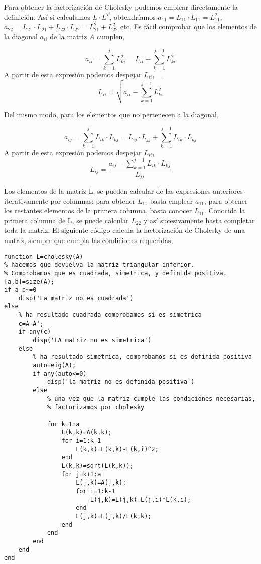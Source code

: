 Para obtener la factorización de Cholesky podemos emplear directamente la definición. Así si calculamos $L\cdot L^T$, obtendríamos $a_{11}=L_{11}\cdot L_{11}=L_{11}^2$,  $a_{22}=L_{21}\cdot L_{21}+L_{22}\cdot L_{22}=L_{21}^2+L_{22}^2$  etc. Es fácil comprobar que los elementos de la diagonal $a_{ii}$ de la matriz $A$ cumplen,

\begin{equation*}
a_{ii}=\sum_{k=1}^{j}L_{ki}^2=L_{ii}+\sum_{k=1}^{j-1}L_{ki}^2
\end{equation*}
A partir de esta expresión podemos despejar $L_{ii}$,
\begin{equation*}
L_{ii}=\sqrt{a_{ii}-\sum_{k=1}^{j-1}L_{ki}^2}
\end{equation*}

Del mismo modo, para los elementos que no pertenecen a la diagonal,

\begin{equation*}
a_{ij}=\sum_{k=1}^{j}L_{ik}\cdot L_{kj}=L_{ij}\cdot L_{jj}+\sum_{k=1}^{j-1}L_{ik}\cdot L_{kj}
\end{equation*}
A partir de esta expresión podemos despejar $L_{ii}$,
\begin{equation*}
L_{ij}=\frac{a_{ij}-\sum_{k=1}^{j-1}L_{ik}\cdot L_{kj}}{L_{jj}}
\end{equation*}

Los elementos de la matriz L, se pueden calcular de las expresiones anteriores iterativamente por columnas: para obtener $L_{11}$ basta emplear $a_{11}$, para obtener los restantes elementos de la primera columna, basta conocer $L_{11}$. Conocida la primera columna de L, se puede calcular $L_{22}$ y así sucesivamente hasta completar toda la matriz. El siguiente código calcula la factorización de Cholesky de una matriz, siempre que cumpla las condiciones requeridas,

\begin{lstlisting}
function L=cholesky(A)
% hacemos que devuelva la matriz triangular inferior.
% Comprobamos que es cuadrada, simetrica, y definida positiva.
[a,b]=size(A);
if a-b~=0
    disp('La matriz no es cuadrada')
else
    % ha resultado cuadrada comprobamos si es simetrica
    c=A-A';
    if any(c)
        disp('LA matriz no es simetrica')
    else
        % ha resultado simetrica, comprobamos si es definida positiva
        auto=eig(A);
        if any(auto<=0)
            disp('la matriz no es definida positiva')
        else
            % una vez que la matriz cumple las condiciones necesarias,
            % factorizamos por cholesky

            for k=1:a
                L(k,k)=A(k,k);
                for i=1:k-1
                    L(k,k)=L(k,k)-L(k,i)^2;
                end
                L(k,k)=sqrt(L(k,k));
                for j=k+1:a
                    L(j,k)=A(j,k);
                    for i=1:k-1
                        L(j,k)=L(j,k)-L(j,i)*L(k,i);
                    end
                    L(j,k)=L(j,k)/L(k,k);
                end
            end
        end
    end
end

\end{lstlisting} 

